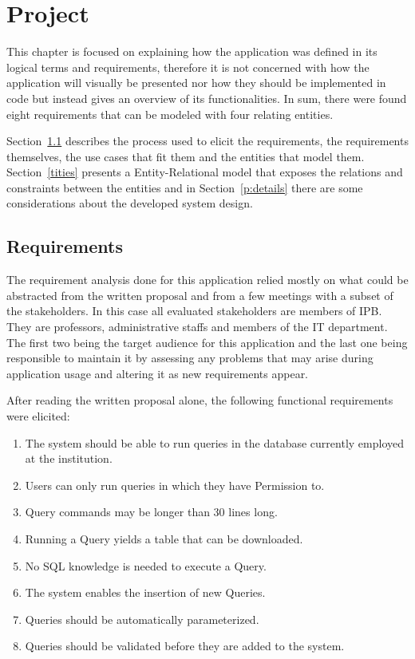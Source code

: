 \chapter{Project}\label{chap:project}

This chapter is focused on explaining how the application was defined in its logical terms and requirements, therefore it is not concerned with how the application will visually be presented nor how they should be implemented in code but instead gives an overview of its functionalities. In sum, there were found eight requirements that can be modeled with four relating entities. 

Section~\ref{p:req} describes the process used to elicit the requirements, the requirements themselves, the use cases that fit them and the entities that model them. Section~\ref{tities} presents a Entity-Relational model that exposes the relations and constraints between the entities and in Section~\ref{p:details} there are some considerations about the developed system design.

\section{Requirements}\label{p:req}
The requirement analysis done for this application relied mostly on what could be abstracted from the written proposal and from a few meetings with a subset of the stakeholders.
In this case all evaluated stakeholders are members of \gls{IPB}. They are professors, administrative staffs and members of the \gls{IT} department. 
The first two being the target audience for this application and the last one being responsible to maintain it by assessing any problems that may arise during application usage and altering it as new requirements appear.

After reading the written proposal alone, the following functional requirements were elicited:

\begin{enumerate}
\item The system should be able to run queries in the database currently employed at the institution.\label{req:multidb}
\item Users can only run queries in which they have Permission to.\label{req:permission}
\item Query commands may be longer than 30 lines long.\label{req:longquery}
\item Running a Query yields a table that can be downloaded.\label{req:download}
\item No \gls{SQL} knowledge is needed to execute a Query.\label{req:noknowledge}
\item The system enables the insertion of new Queries.\label{req:addquery}
\item Queries should be automatically parameterized.\label{req:no:param}
\item Queries should be validated before they are added to the system.\label{req:no:valid}
\end{enumerate}

